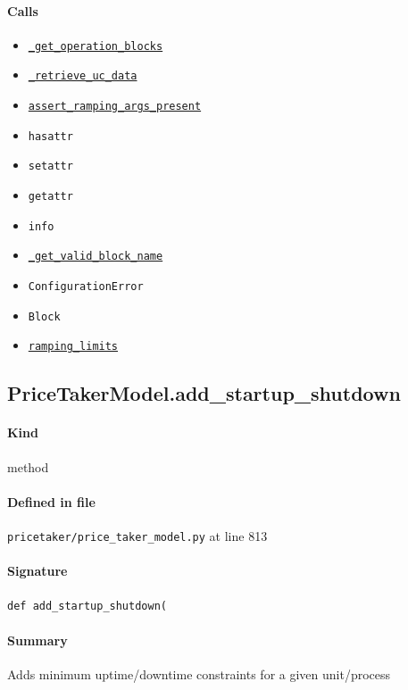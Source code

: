 \documentclass[11pt]{report}
\begin{document}
\paragraph{Calls}
\begin{itemize}[leftmargin=*]
  \item \hyperref[def:pricetaker-price_taker_model.py:PriceTakerModel._get_operation_blocks:L445]{\texttt{\_get\_operation\_blocks}}
  \item \hyperref[def:pricetaker-price_taker_model.py:PriceTakerModel._retrieve_uc_data:L628]{\texttt{\_retrieve\_uc\_data}}
  \item \hyperref[def:pricetaker-unit_commitment.py:UnitCommitmentData.assert_ramping_args_present:L116]{\texttt{assert\_ramping\_args\_present}}
  \item \texttt{hasattr}
  \item \texttt{setattr}
  \item \texttt{getattr}
  \item \texttt{info}
  \item \hyperref[def:pricetaker-price_taker_model.py:PriceTakerModel._get_valid_block_name:L645]{\texttt{\_get\_valid\_block\_name}}
  \item \texttt{ConfigurationError}
  \item \texttt{Block}
  \item \hyperref[def:pricetaker-unit_commitment.py:ramping_limits:L205]{\texttt{ramping\_limits}}
\end{itemize}
\subsection{PriceTakerModel.add\_startup\_shutdown}
\label{def:pricetaker-price_taker_model.py:PriceTakerModel.add_startup_shutdown:L813}
\paragraph{Kind} method
\paragraph{Defined in file} \texttt{pricetaker/price\_taker\_model.py} at line 813
\paragraph{Signature} \texttt{def add\_startup\_shutdown(}
\paragraph{Summary} Adds minimum uptime/downtime constraints for a given unit/process
\end{document}
